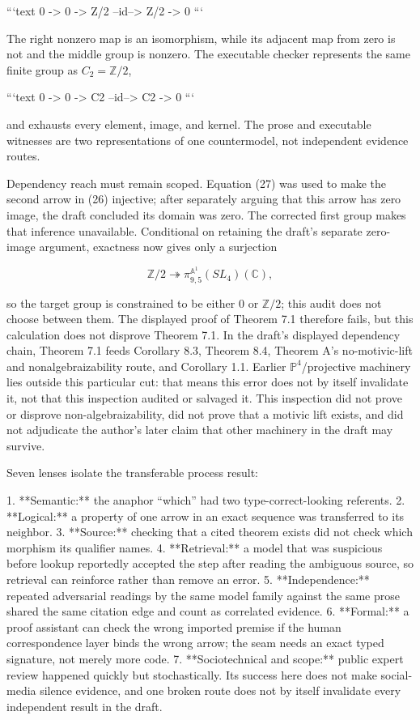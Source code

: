 \documentclass[11pt]{article}
\begin{document}
\begin{markdown}
```text
0 -> 0 -> Z/2 --id--> Z/2 -> 0
```

The right nonzero map is an isomorphism, while its adjacent map from zero is not and the middle
group is nonzero. The executable checker represents the same finite group as
$C_2=\mathbb Z/2$,

```text
0 -> 0 -> C2 --id--> C2 -> 0
```

and exhausts every element, image, and kernel. The prose and executable witnesses are two
representations of one countermodel, not independent evidence routes.

Dependency reach must remain scoped. Equation (27) was used to make the second arrow in (26)
injective; after separately arguing that this arrow has zero image, the draft concluded its domain
was zero. The corrected first group makes that inference unavailable. Conditional on retaining the
draft's separate zero-image argument, exactness now gives only a surjection

$$
 \mathbb Z/2 \twoheadrightarrow
 \pi^{\mathbb A^1}_{9,5}(SL_4)(\mathbb C),
$$

so the target group is constrained to be either $0$ or $\mathbb Z/2$; this audit does not choose
between them. The displayed proof of Theorem 7.1 therefore fails, but this calculation does not
disprove Theorem 7.1. In the draft's displayed dependency chain, Theorem 7.1 feeds Corollary 8.3,
Theorem 8.4, Theorem A's no-motivic-lift and nonalgebraizability route, and Corollary 1.1. Earlier
$\mathbb P^4$/projective machinery lies outside this particular cut: that means this error does not
by itself invalidate it, not that this inspection audited or salvaged it. This inspection did not
prove or disprove non-algebraizability, did not prove that a motivic lift exists, and did not
adjudicate the author's later claim that other machinery in the draft may survive.

Seven lenses isolate the transferable process result:

1. **Semantic:** the anaphor “which” had two type-correct-looking referents.
2. **Logical:** a property of one arrow in an exact sequence was transferred to its neighbor.
3. **Source:** checking that a cited theorem exists did not check which morphism its qualifier names.
4. **Retrieval:** a model that was suspicious before lookup reportedly accepted the step after
   reading the ambiguous source, so retrieval can reinforce rather than remove an error.
5. **Independence:** repeated adversarial readings by the same model family against the same prose
   shared the same citation edge and count as correlated evidence.
6. **Formal:** a proof assistant can check the wrong imported premise if the human correspondence
   layer binds the wrong arrow; the seam needs an exact typed signature, not merely more code.
7. **Sociotechnical and scope:** public expert review happened quickly but stochastically. Its
   success here does not make social-media silence evidence, and one broken route does not by
   itself invalidate every independent result in the draft.


\end{markdown}
\end{document}

